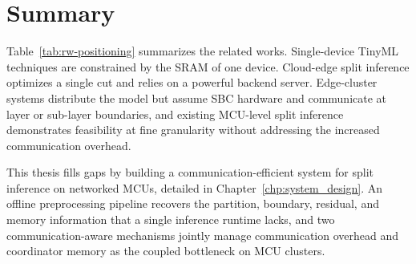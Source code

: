 \section{Summary}
\label{sec:bg-summary}

Table~\ref{tab:rw-positioning} summarizes the related works.
Single-device TinyML techniques are constrained by the SRAM of one device.
Cloud-edge split inference optimizes a single cut and relies on a powerful backend server.
Edge-cluster systems distribute the model but assume SBC hardware and communicate at layer or sub-layer boundaries, and existing MCU-level split inference demonstrates feasibility at fine granularity without addressing the increased communication overhead.

This thesis fills gaps by building a communication-efficient system for split inference on networked MCUs, detailed in Chapter~\ref{chp:system_design}.
An offline preprocessing pipeline recovers the partition, boundary, residual, and memory information that a single inference runtime lacks, and two communication-aware mechanisms jointly manage communication overhead and coordinator memory as the coupled bottleneck on MCU clusters.







